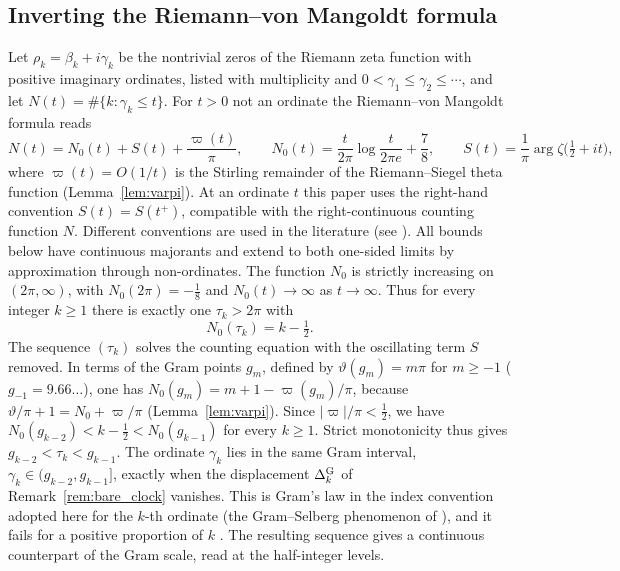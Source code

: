 \documentclass[11pt,a4paper]{article}
\makeatletter
\numberwithin{equation}{section}
\DeclareRobustCommand{\CGref}[1]{\ref{#1}}
\DeclareRobustCommand{\CGcite}[2][]{\if\relax\detokenize{#1}\relax\cite{#2}\else\cite[#1]{#2}\fi}
\let\CG@origref\ref
\newcommand{\CG@gettip}[1]{\@ifundefined{CGTip@#1}{#1}{\csname CGTip@#1\endcsname}}
\newcommand{\CG@getbib}[1]{\@ifundefined{CGBib@#1}{#1}{\csname CGBib@#1\endcsname}}
\DeclareRobustCommand{\CGref}[1]{\pdftooltip{\CG@origref{#1}}{\CG@gettip{#1}}}
\DeclareRobustCommand{\CGcite}[2][]{\pdftooltip{\if\relax\detokenize{#1}\relax\cite{#2}\else\cite[#1]{#2}\fi}{\CG@getbib{#2}}}
\theoremstyle{definition}
\theoremstyle{remark}
\newcommand{\Nz}{N_0} %
\makeatother
\begin{document}
\subsection{Inverting the Riemann--von Mangoldt formula}\label{subsec:clock_intro}
Let $\rho_k=\beta_k+i\gamma_k$ be the nontrivial zeros of the Riemann zeta function with positive imaginary ordinates, listed with multiplicity and $0<\gamma_1\le\gamma_2\le\cdots$, and let $N(t)=\#\{k:\gamma_k\le t\}$. For $t>0$ not an ordinate the Riemann--von Mangoldt formula reads \CGcite[\S9.3]{Titchmarsh1986}
\begin{equation}
N(t)=\Nz(t)+S(t)+\frac{\varpi(t)}\pi,\qquad \Nz(t)=\frac t{2\pi}\log\frac t{2\pi e}+\frac78,\qquad S(t)=\frac1\pi\arg\zeta\bigl(\tfrac12+it\bigr),
\label{eq:intro_RvM}
\end{equation}
where $\varpi(t)=O(1/t)$ is the Stirling remainder of the Riemann--Siegel theta function (Lemma~\CGref{lem:varpi}). At an ordinate $t$ this paper uses the right-hand convention $S(t)=S(t^+)$, compatible with the right-continuous counting function $N$. Different conventions are used in the literature (see \CGcite[\S9.3]{Titchmarsh1986}). All bounds below have continuous majorants and extend to both one-sided limits by approximation through non-ordinates. The function $\Nz$ is strictly increasing on $(2\pi,\infty)$, with $\Nz(2\pi)=-\frac18$ and $\Nz(t)\to\infty$ as $t\to\infty$. Thus for every integer $k\ge1$ there is exactly one $\tau_k>2\pi$ with
\begin{equation}
\Nz(\tau_k)=k-\tfrac12 .
\label{eq:intro_clock}
\end{equation}
The sequence $(\tau_k)$ solves the counting equation with the oscillating term $S$ removed. In terms of the Gram points $g_m$, defined by $\vartheta(g_m)=m\pi$ for $m\ge-1$ ($g_{-1}=9.66\ldots$), one has $\Nz(g_m)=m+1-\varpi(g_m)/\pi$, because $\vartheta/\pi+1=\Nz+\varpi/\pi$ (Lemma~\CGref{lem:varpi}). Since $|\varpi|/\pi<\frac12$, we have $\Nz(g_{k-2})<k-\frac12<\Nz(g_{k-1})$ for every $k\ge1$. Strict monotonicity thus gives $g_{k-2}<\tau_k<g_{k-1}$. The ordinate $\gamma_k$ lies in the same Gram interval, $\gamma_k\in(g_{k-2},g_{k-1}]$, exactly when the displacement $\Delta^{\rm G}_k$ of Remark~\CGref{rem:bare_clock} vanishes. This is Gram's law in the index convention adopted here for the $k$-th ordinate (the Gram--Selberg phenomenon of \CGcite[Def.~1.4]{Korolev2012}), and it fails for a positive proportion of $k$ \CGcite[p.~58]{Korolev2012}. The resulting sequence gives a continuous counterpart of the Gram scale, read at the half-integer levels.
\end{document}
